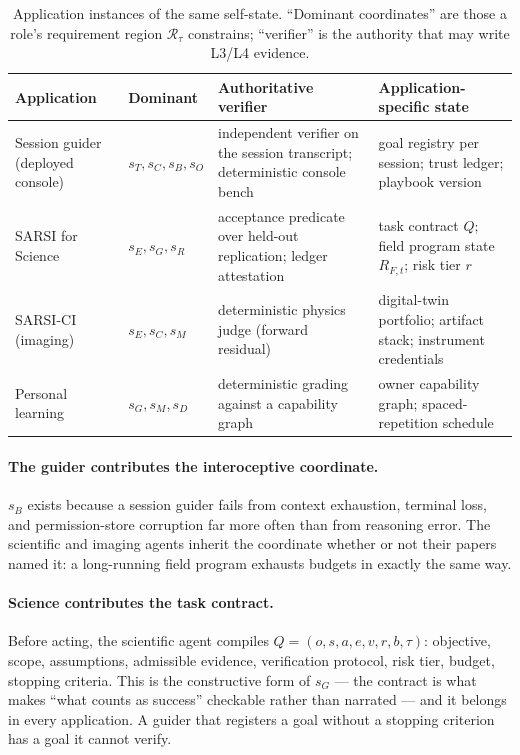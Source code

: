 \documentclass[11pt]{article}
\begin{document}
\begin{table}[t]
\centering\small
\caption{Application instances of the same self-state. ``Dominant coordinates'' are those a role's requirement region $\mathcal{R}_\tau$ constrains; ``verifier'' is the authority that may write L3/L4 evidence.}
\label{tab:apps}
\begin{tabular}{p{2.9cm} p{2.5cm} p{4.2cm} p{5.4cm}}
\toprule
\textbf{Application} & \textbf{Dominant} & \textbf{Authoritative verifier} & \textbf{Application-specific state} \\
\midrule
Session guider (deployed console) & $s_T, s_C, s_B, s_O$ & independent verifier on the session transcript; deterministic console bench & goal registry per session; trust ledger; playbook version \\
SARSI for Science & $s_E, s_G, s_R$ & acceptance predicate over held-out replication; ledger attestation & task contract $Q$; field program state $R_{F,t}$; risk tier $r$ \\
SARSI-CI (imaging) & $s_E, s_C, s_M$ & deterministic physics judge (forward residual) & digital-twin portfolio; artifact stack; instrument credentials \\
Personal learning & $s_G, s_M, s_D$ & deterministic grading against a capability graph & owner capability graph; spaced-repetition schedule \\
\bottomrule
\end{tabular}
\end{table}

\paragraph{The guider contributes the interoceptive coordinate.} $s_B$ exists because a session guider fails from context exhaustion, terminal loss, and permission-store corruption far more often than from reasoning error. The scientific and imaging agents inherit the coordinate whether or not their papers named it: a long-running field program exhausts budgets in exactly the same way.

\paragraph{Science contributes the task contract.} Before acting, the scientific agent compiles $Q = (o,s,a,e,v,r,b,\tau)$: objective, scope, assumptions, admissible evidence, verification protocol, risk tier, budget, stopping criteria. This is the constructive form of $s_G$ --- the contract is what makes ``what counts as success'' checkable rather than narrated --- and it belongs in every application. A guider that registers a goal without a stopping criterion has a goal it cannot verify.
\end{document}
